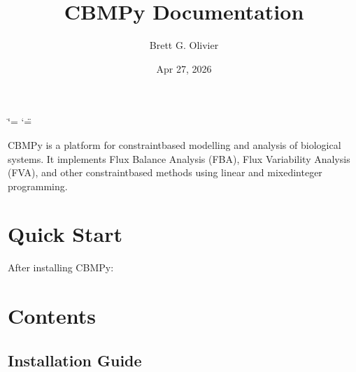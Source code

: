 \documentclass[letterpaper,12pt,english]{sphinxmanual}
\title{CBMPy Documentation}
\date{Apr 27, 2026}
\author{Brett G. Olivier}
\begin{document}
\ifdefined\shorthandoff
  \ifnum\catcode`\=\string=\active\shorthandoff{=}\fi
  \ifnum\catcode`\"=\active{}\fi
\fi

\pagestyle{empty}
\sphinxmaketitle
\pagestyle{plain}
\sphinxtableofcontents
\pagestyle{normal}
\label{\detokenize{index::doc}}


\sphinxAtStartPar
CBMPy is a platform for constraint\sphinxhyphen{}based modelling and analysis of biological systems.
It implements Flux Balance Analysis (FBA), Flux Variability Analysis (FVA), and other
constraint\sphinxhyphen{}based methods using linear and mixed\sphinxhyphen{}integer programming.


\chapter{Quick Start}
\label{\detokenize{index:quick-start}}
\sphinxAtStartPar
After installing CBMPy:

\begin{sphinxVerbatim}[commandchars=\\\{\}]

  

  

\PYG{p}{[}\PYG{p}{]}
\end{sphinxVerbatim}


\chapter{Contents}
\label{\detokenize{index:contents}}
\sphinxstepscope


\section{Installation Guide}
\label{\detokenize{installation:installation-guide}}\label{\detokenize{installation::doc}}
\end{document}
